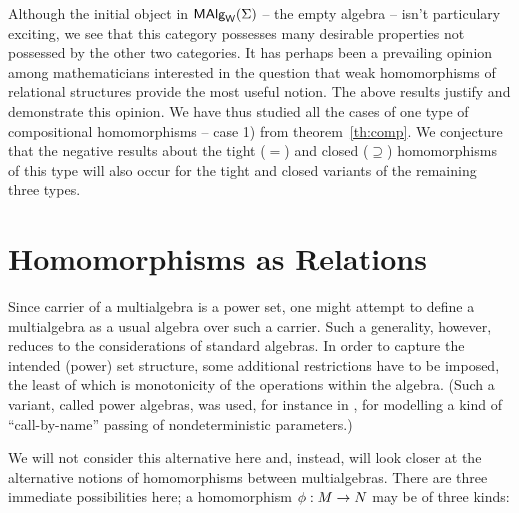 \documentclass[10pt]{article}
\begin{document}
Although the initial object in $\mbox{\rm\sf MAlg}_{\sf W}(\Sigma)$ -- the empty algebra -- isn't
particulary exciting, we see that this category possesses many desirable
properties not possessed by the other two categories.
It has perhaps been a prevailing opinion among mathematicians
interested in the question that weak homomorphisms of relational
structures provide the most useful notion.  The above results justify
and demonstrate this opinion. We have thus studied all the cases of
one type of compositional homomorphisms -- case 1) from
theorem~\ref{th:comp}. We conjecture that the negative results about
the tight ($=$) and closed ($\supseteq$) homomorphisms of this type will also occur for
the tight and closed variants of the remaining three types.




\section{Homomorphisms as Relations}
\label{se:horel}

Since carrier of a multialgebra is a power set, one might attempt to
define a multialgebra as a usual algebra over such a carrier.  Such a
generality, however, reduces to the considerations of standard
algebras. In order to capture the intended (power) set structure, some
additional restrictions have to be imposed, the least of which is
monotonicity of the operations within the algebra. (Such a variant,
called power algebras, was used, for instance in \cite{c:130}, for
modelling a kind of ``call-by-name'' passing of nondeterministic
parameters.)

We will not consider this alternative here and, instead, will look
closer at the alternative notions of homomorphisms between
multialgebras. There are three
immediate possibilities here; a homomorphism $\phi:M\rightarrow N$ may be of
three kinds:
\end{document}
